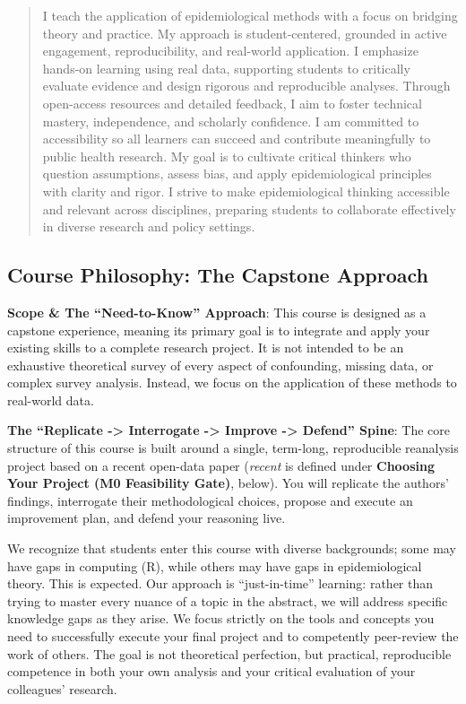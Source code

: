 \documentclass[
]{article}
\begin{document}
\begin{quote}
I teach the application of epidemiological methods with a focus on
bridging theory and practice. My approach is student-centered, grounded
in active engagement, reproducibility, and real-world application. I
emphasize hands-on learning using real data, supporting students to
critically evaluate evidence and design rigorous and reproducible
analyses. Through open-access resources and detailed feedback, I aim to
foster technical mastery, independence, and scholarly confidence. I am
committed to accessibility so all learners can succeed and contribute
meaningfully to public health research. My goal is to cultivate critical
thinkers who question assumptions, assess bias, and apply
epidemiological principles with clarity and rigor. I strive to make
epidemiological thinking accessible and relevant across disciplines,
preparing students to collaborate effectively in diverse research and
policy settings.
\end{quote}

\subsection{Course Philosophy: The Capstone
Approach}\label{course-philosophy-the-capstone-approach}

\textbf{Scope \& The ``Need-to-Know'' Approach}: This course is designed
as a capstone experience, meaning its primary goal is to integrate and
apply your existing skills to a complete research project. It is not
intended to be an exhaustive theoretical survey of every aspect of
confounding, missing data, or complex survey analysis. Instead, we focus
on the application of these methods to real-world data.

\textbf{The ``Replicate -\textgreater{} Interrogate -\textgreater{}
Improve -\textgreater{} Defend'' Spine}: The core structure of this
course is built around a single, term-long, reproducible reanalysis
project based on a recent open-data paper (\emph{recent} is defined
under \textbf{Choosing Your Project (M0 Feasibility Gate)}, below). You
will replicate the authors' findings, interrogate their methodological
choices, propose and execute an improvement plan, and defend your
reasoning live.

We recognize that students enter this course with diverse backgrounds;
some may have gaps in computing (R), while others may have gaps in
epidemiological theory. This is expected. Our approach is
``just-in-time'' learning: rather than trying to master every nuance of
a topic in the abstract, we will address specific knowledge gaps as they
arise. We focus strictly on the tools and concepts you need to
successfully execute your final project and to competently peer-review
the work of others. The goal is not theoretical perfection, but
practical, reproducible competence in both your own analysis and your
critical evaluation of your colleagues' research.
\end{document}

